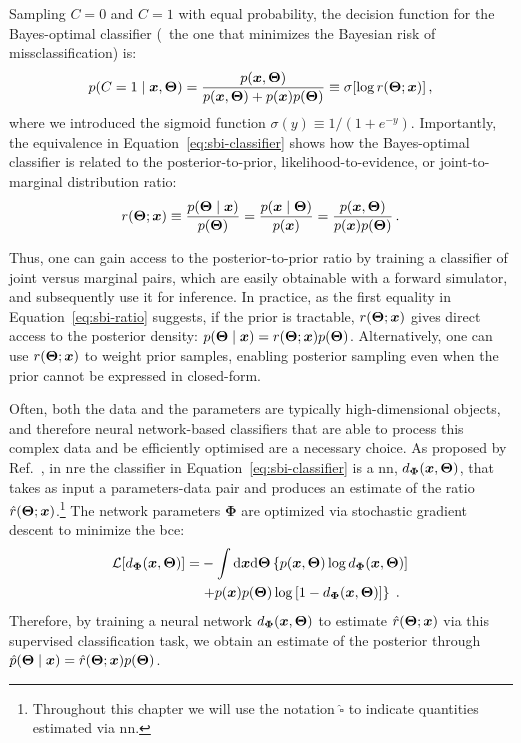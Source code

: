 Sampling $C=0$ and $C=1$ with equal probability, the decision function for the Bayes-optimal classifier  \cite{Devroye:1996aa} (\ie~the one that minimizes the Bayesian risk of missclassification) is:
\begin{equation} \label{eq:sbi-classifier}
    p(C = 1 \mid \bm{x}, \bm{\Theta}) = \frac{p(\bm{x}, \bm{\Theta})}{p(\bm{x}, \bm{\Theta}) + p(\bm{x}) p(\bm{\Theta})} \equiv \sigma[ \log r(\bm{\Theta}; \bm{x})] \, ,
\end{equation}
where we introduced the sigmoid function $\sigma(y) \equiv 1 / (1 + e^{-y})$. Importantly, the equivalence in Equation~\eqref{eq:sbi-classifier} shows how the Bayes-optimal classifier is related to the  posterior-to-prior, likelihood-to-evidence, or joint-to-marginal distribution ratio:
\begin{equation} \label{eq:sbi-ratio}
    r(\bm{\Theta};\bm{x}) \equiv \frac{p(\bm{\Theta} \mid \bm{x})}{p(\bm{\Theta})} = \frac{p(\bm{x} \mid \bm{\Theta})}{p(\bm{x})} =  \frac{p(\bm{x}, \bm{\Theta})}{p(\bm{x}) p(\bm{\Theta})} \, .
\end{equation}

Thus, one can gain access to the posterior-to-prior ratio by training a classifier of joint versus marginal pairs, which are easily obtainable with a forward simulator, and subsequently use it for inference. In practice, as the first equality in Equation~\eqref{eq:sbi-ratio} suggests, if the prior is tractable, $r(\bm{\Theta};\bm{x})$ gives direct access to the posterior density:  $p(\bm{\Theta} \mid \bm{x})=r(\bm{\Theta};\bm{x})p(\bm{\Theta})$.  Alternatively, one can use $r(\bm{\Theta};\bm{x})$ to weight prior samples, enabling posterior sampling even when the prior cannot be expressed in closed-form.

Often, both the data and the parameters are typically high-dimensional objects, and therefore neural network-based classifiers that are able to process this complex data and be efficiently optimised are a necessary choice.
As proposed by Ref.~\cite{Hermans:2019ioj}, in \gls*{nre} the classifier in Equation~\eqref{eq:sbi-classifier} is a \gls*{nn},  $d_{\bm{\Phi}}(\bm{x}, \bm{\Theta})$, that takes as input a parameters-data pair and produces an estimate of the ratio $\hat{r}(\bm{\Theta};\bm{x})$.\footnote{Throughout this chapter we will use the notation $\hat{\square}$ to indicate quantities estimated via \gls*{nn}.} 
The network parameters ${\bm{\Phi}}$ are optimized via stochastic gradient descent to minimize the \gls*{bce}:
\begin{equation}\label{eq:sbi-bce}
\begin{split}
    \mathcal{L}[d_{\bm{\Phi}}(\bm{x}, \bm{\Theta})] = &-\int \dd \bm{x}  \dd\bm{\Theta} \left\{ p(\bm{x}, \bm{\Theta}) \log d_{\bm{\Phi}}(\bm{x}, \bm{\Theta}) ] \right. \\
    & \left. + p(\bm{x}) p(\bm{\Theta}) \log\left[ 1 - d_{\bm{\Phi}}(\bm{x}, \bm{\Theta}) \right] \right\}\; .
\end{split}
\end{equation}
Therefore, by training a neural network $d_{\bm{\Phi}}(\bm{x}, \bm{\Theta})$ to estimate $\hat{r}(\bm{\Theta}; \bm{x})$ via this supervised classification task, we obtain an estimate of the posterior through $\hat{p}(\bm{\Theta} \mid \bm{x}) = \hat{r}(\bm{\Theta}; \bm{x}) p(\bm{\Theta})$. 

